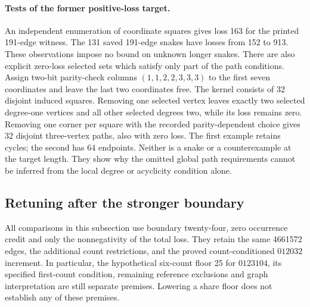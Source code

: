 \documentclass[11pt,a4paper]{article}
\theoremstyle{definition}
\theoremstyle{remark}
\begin{document}
\paragraph{Tests of the former positive-loss target.}
An independent enumeration of coordinate squares gives loss 163 for the
printed 191-edge witness. The 131 saved 191-edge snakes have losses from
152 to 913. These observations impose no bound on unknown longer snakes.
There are also explicit zero-loss selected sets which satisfy only part
of the path conditions. Assign two-bit parity-check columns
$(1,1,2,2,3,3,3)$ to the first seven coordinates and leave the last two
coordinates free. The kernel consists of 32 disjoint induced squares.
Removing one selected vertex leaves exactly two selected degree-one
vertices and all other selected degrees two, while its loss remains zero.
Removing one corner per square with the recorded parity-dependent choice
gives 32 disjoint three-vertex paths, also with zero loss.
The first example retains cycles; the second has 64 endpoints.
Neither is a snake or a counterexample at the target length. They show
why the omitted global path requirements cannot be inferred from the
local degree or acyclicity condition alone.

\subsection{Retuning after the stronger boundary}\label{sec:boundary-retuning}
All comparisons in this subsection use boundary twenty-four, zero
occurrence credit and only the nonnegativity of the total loss. They
retain the same 4661572 edges, the additional count restrictions, and the
proved count-conditioned $012032$ increment. In particular, the hypothetical
six-count floor 25 for $0123104$, its specified first-count condition,
remaining reference exclusions and graph interpretation are still separate
premises. Lowering a share floor does not establish any of these premises.
\end{document}

